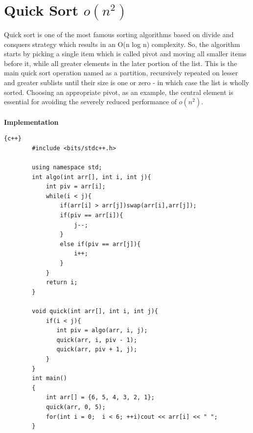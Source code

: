\newpage

\section{Quick Sort $o(n^2)$}

Quick sort is one of the most famous sorting algorithms based on divide and conquers strategy which results in an O(n log n) complexity. So, the algorithm starts by picking a single item which is called pivot and moving all smaller items before it, while all greater elements in the later portion of the list. This is the main quick sort operation named as a partition, recursively repeated on lesser and greater sublists until their size is one or zero - in which case the list is wholly sorted. Choosing an appropriate pivot, as an example, the central element is essential for avoiding the severely reduced performance of $o(n^2)$.
\\
\\
\newline\newline
\textbf{{\Large{Implementation}}}
\begin{lstlisting}{c++}
        #include <bits/stdc++.h>
        
        using namespace std;
        int algo(int arr[], int i, int j){
            int piv = arr[i];
            while(i < j){
                if(arr[i] > arr[j])swap(arr[i],arr[j]);
                if(piv == arr[i]){
                    j--;
                }
                else if(piv == arr[j]){
                    i++;
                }
            }
            return i;
        }
        
        void quick(int arr[], int i, int j){
            if(i < j){
               int piv = algo(arr, i, j);
               quick(arr, i, piv - 1);
               quick(arr, piv + 1, j);
            }
        }
        int main()
        {
            int arr[] = {6, 5, 4, 3, 2, 1};
            quick(arr, 0, 5);
            for(int i = 0;  i < 6; ++i)cout << arr[i] << " ";
        }

\end{lstlisting}
